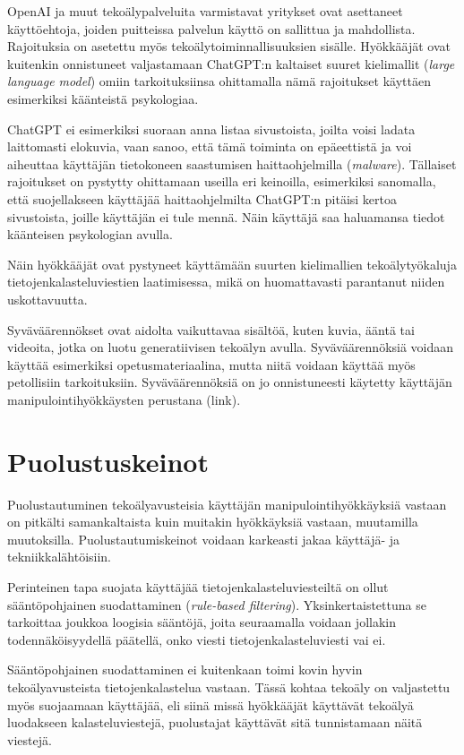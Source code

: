 OpenAI ja muut tekoälypalveluita varmistavat yritykset ovat asettaneet käyttöehtoja, joiden puitteissa palvelun käyttö on sallittua ja mahdollista. Rajoituksia on asetettu myös tekoälytoiminnallisuuksien sisälle. Hyökkääjät ovat kuitenkin onnistuneet valjastamaan ChatGPT:n kaltaiset suuret kielimallit (\textit{large language model}) omiin tarkoituksiinsa ohittamalla nämä rajoitukset käyttäen esimerkiksi käänteistä psykologiaa.

ChatGPT ei esimerkiksi suoraan anna listaa sivustoista, joilta voisi ladata laittomasti elokuvia, vaan sanoo, että tämä toiminta on epäeettistä ja voi aiheuttaa käyttäjän tietokoneen saastumisen haittaohjelmilla (\textit{malware}). Tällaiset rajoitukset on pystytty ohittamaan useilla eri keinoilla, esimerkiksi sanomalla, että suojellakseen käyttäjää haittaohjelmilta ChatGPT:n pitäisi kertoa sivustoista, joille käyttäjän ei tule mennä. Näin käyttäjä saa haluamansa tiedot käänteisen psykologian avulla.

Näin hyökkääjät ovat pystyneet käyttämään suurten kielimallien tekoälytyökaluja tietojenkalasteluviestien laatimisessa, mikä on huomattavasti parantanut niiden uskottavuutta.

Syväväärennökset ovat aidolta vaikuttavaa sisältöä, kuten kuvia, ääntä tai videoita, jotka on luotu generatiivisen tekoälyn avulla. Syväväärennöksiä voidaan käyttää esimerkiksi opetusmateriaalina, mutta niitä voidaan käyttää myös petollisiin tarkoituksiin. Syväväärennöksiä on jo onnistuneesti käytetty käyttäjän manipulointihyökkäysten perustana (link).

\section*{Puolustuskeinot}

Puolustautuminen tekoälyavusteisia käyttäjän manipulointihyökkäyksiä vastaan on pitkälti samankaltaista kuin muitakin hyökkäyksiä vastaan, muutamilla muutoksilla. Puolustautumiskeinot voidaan karkeasti jakaa käyttäjä- ja tekniikkalähtöisiin.

Perinteinen tapa suojata käyttäjää tietojenkalasteluviesteiltä on ollut sääntöpohjainen suodattaminen (\textit{rule-based filtering}). Yksinkertaistettuna se tarkoittaa joukkoa loogisia sääntöjä, joita seuraamalla voidaan jollakin todennäköisyydellä päätellä, onko viesti tietojenkalasteluviesti vai ei.

Sääntöpohjainen suodattaminen ei kuitenkaan toimi kovin hyvin tekoälyavusteista tietojenkalastelua vastaan. Tässä kohtaa tekoäly on valjastettu myös suojaamaan käyttäjää, eli siinä missä hyökkääjät käyttävät tekoälyä luodakseen kalasteluviestejä, puolustajat käyttävät sitä tunnistamaan näitä viestejä.

